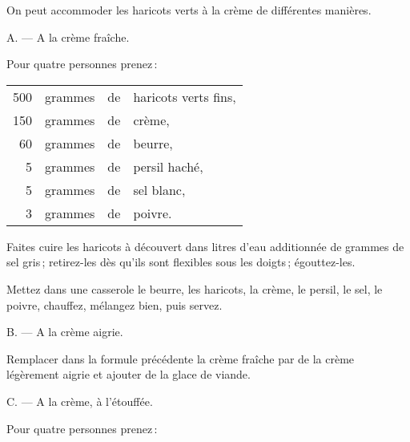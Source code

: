 On peut accommoder les haricots verts à la crème de différentes manières.

\medskip

A. — A la crème fraîche.

\medskip

Pour quatre personnes prenez :

\footnotesize
\begin{longtable}{rrrp{16em}}
    500 & grammes & de & haricots verts fins,                                                             \\
    150 & grammes & de & crème,                                                                           \\
     60 & grammes & de & beurre,                                                                          \\
      5 & grammes & de & persil haché,                                                                    \\
      5 & grammes & de & sel blanc,                                                                       \\
      3 & grammes & de & poivre.                                                                          \\
\end{longtable}
\normalsize

Faites cuire les haricots à découvert dans {\mmm} litres d'eau additionnée
de {\mmm} grammes de sel gris ; retirez-les dès qu'ils sont flexibles
sous les doigts ; égouttez-les.

Mettez dans une casserole le beurre, les haricots, la crème, le persil, le sel,
le poivre, chauffez, mélangez bien, puis servez.

\medskip

B. — A la crème aigrie.

\medskip

Remplacer dans la formule précédente la crème fraîche par de la crème
légèrement aigrie et ajouter de la glace de viande.

\medskip

C. — A la crème, à l'étouffée.

\medskip

Pour quatre personnes prenez :


